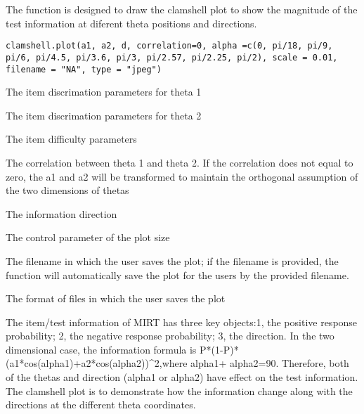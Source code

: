 \begin{Description}\relax
The function is designed to draw the clamshell plot to show the magnitude of the test information at diferent theta positions and directions.
\end{Description}
\begin{Usage}
\begin{verbatim}
clamshell.plot(a1, a2, d, correlation=0, alpha =c(0, pi/18, pi/9, pi/6, pi/4.5, pi/3.6, pi/3, pi/2.57, pi/2.25, pi/2), scale = 0.01, filename = "NA", type = "jpeg")
\end{verbatim}
\end{Usage}
\begin{Arguments}
\begin{ldescription}
\item[\code{a1}] The item discrimation parameters for theta 1
\item[\code{a2}] The item discrimation parameters for theta 2
\item[\code{d}] The item difficulty parameters 
\item[\code{correlation}] The correlation between theta 1 and theta 2. If the correlation does not equal to zero, the a1 and a2 will be transformed to maintain the orthogonal assumption of the two dimensions of thetas 
\item[\code{alpha}] The information direction 
\item[\code{scale}] The control parameter of the plot size
\item[\code{filename}] The filename in which the user saves the plot; if the filename is provided, the function will automatically save the plot for the users by the provided filename.  
\item[\code{type}] The format of files in which the user saves the plot 
\end{ldescription}
\end{Arguments}
\begin{Details}\relax
The item/test information of MIRT has three key objects:1, the positive response probability; 2, the negative response probability; 3, the direction. 
In the two dimensional case, the information formula is P*(1-P)*(a1*cos(alpha1)+a2*cos(alpha2))^2,where alpha1+ alpha2=90. Therefore, both of the thetas and direction (alpha1 or alpha2) have effect on the test information.
The clamshell plot is to demonstrate how the information change along with the directions at the different theta coordinates.
\end{Details}
